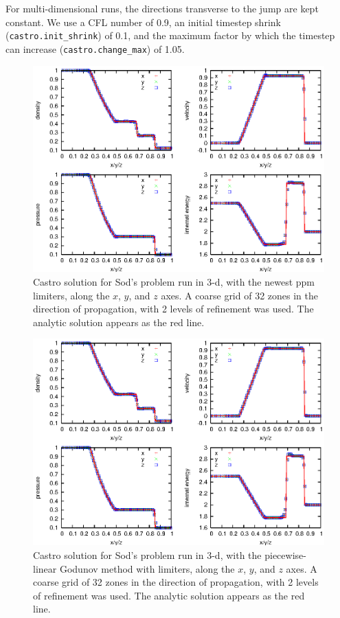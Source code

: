 For multi-dimensional runs, the directions transverse to the jump are
kept constant.  We use a CFL number of 0.9, an initial timestep shrink
({\tt castro.init\_shrink}) of 0.1, and the maximum factor by which
the timestep can increase ({\tt castro.change\_max}) of 1.05.
\begin{figure}[h]
\centering
\includegraphics[width=4.75in]{CastroVerification/sod_3d}
\caption{\label{fig:sod} Castro solution for Sod's problem run in 3-d,
  with the newest ppm limiters, 
  along the $x$, $y$, and $z$ axes.  A coarse grid of 32 zones in the
  direction of propagation, with 2 levels of refinement was used.  The
  analytic solution appears as the red line.}
\end{figure}
\begin{figure}[h]
\centering
\includegraphics[width=4.75in]{CastroVerification/sod_3d_ppm0}
\caption{\label{fig:sod_ppm0} Castro solution for Sod's problem run in 3-d,
  with the piecewise-linear Godunov method with limiters,
  along the $x$, $y$, and $z$ axes.  A coarse grid of 32 zones in the
  direction of propagation, with 2 levels of refinement was used.  The
  analytic solution appears as the red line.}
\end{figure}

